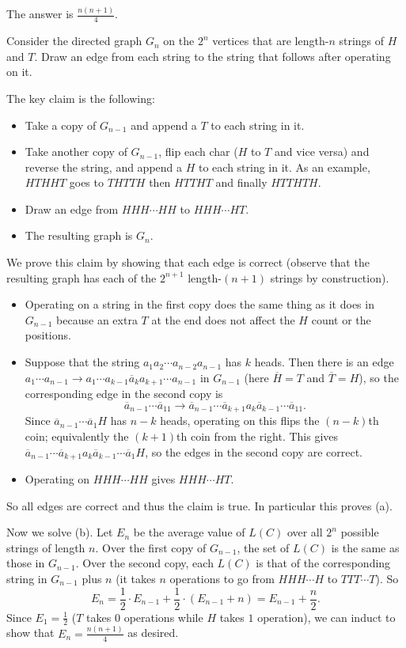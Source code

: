 The answer is $\frac{n(n+1)}{4}$.

Consider the directed graph $G_n$ on the $2^n$ vertices that are length-$n$ strings of $H$ and $T$. Draw an edge from each string to the string that follows after operating on it.

The key claim is the following:
\begin{itemize}
	\item Take a copy of $G_{n-1}$ and append a $T$ to each string in it.
	\item Take another copy of $G_{n-1}$, flip each char ($H$ to $T$ and vice versa) and reverse the string, and append a $H$ to each string in it. As an example, $HTHHT$ goes to $THTTH$ then $HTTHT$ and finally $HTTHTH$.
	\item Draw an edge from $HHH\cdots HH$ to $HHH\cdots HT$.
	\item The resulting graph is $G_n$.
\end{itemize}
We prove this claim by showing that each edge is correct (observe that the resulting graph has each of the $2^{n+1}$ length-$(n+1)$ strings by construction).
\begin{itemize}
	\item Operating on a string in the first copy does the same thing as it does in $G_{n-1}$ because an extra $T$ at the end does not affect the $H$ count or the positions.
	\item Suppose that the string $a_1a_2\cdots a_{n-2}a_{n-1}$ has $k$ heads. Then there is an edge $a_1\cdots a_{n-1}\to a_1\cdots a_{k-1}\overline{a}_ka_{k+1}\cdots a_{n-1}$ in $G_{n-1}$ (here $\overline{H}=T$ and $\overline{T}=H$), so the corresponding edge in the second copy is \[\overline{a}_{n-1}\cdots\overline{a}_11\to\overline{a}_{n-1}\cdots\overline{a}_{k+1}a_k\overline{a}_{k-1}\cdots\overline{a}_11.\] Since $\overline{a}_{n-1}\cdots\overline{a}_1H$ has $n-k$ heads, operating on this flips the $(n-k)$th coin; equivalently the $(k+1)$th coin from the right. This gives $\overline{a}_{n-1}\cdots\overline{a}_{k+1}a_k\overline{a}_{k-1}\cdots\overline{a}_1H$, so the edges in the second copy are correct.
	\item Operating on $HHH\cdots HH$ gives $HHH\cdots HT$.
\end{itemize}
So all edges are correct and thus the claim is true. In particular this proves (a).

Now we solve (b). Let $E_n$ be the average value of $L(C)$ over all $2^n$ possible strings of length $n$. Over the first copy of $G_{n-1}$, the set of $L(C)$ is the same as those in $G_{n-1}$. Over the second copy, each $L(C)$ is that of the corresponding string in $G_{n-1}$ plus $n$ (it takes $n$ operations to go from $HHH\cdots H$ to $TTT\cdots T$). So \[E_n=\frac{1}{2}\cdot E_{n-1}+\frac{1}{2}\cdot(E_{n-1}+n)=E_{n-1}+\frac{n}{2}.\] Since $E_1=\frac{1}{2}$ ($T$ takes $0$ operations while $H$ takes $1$ operation), we can induct to show that $E_n=\frac{n(n+1)}{4}$ as desired.